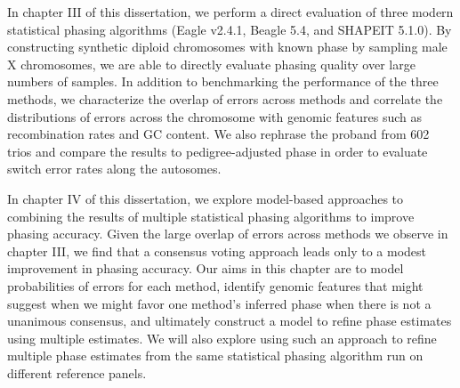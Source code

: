 In chapter III of this dissertation, we perform a direct evaluation of three modern statistical phasing algorithms (Eagle v2.4.1, Beagle 5.4, and SHAPEIT 5.1.0). By constructing synthetic diploid chromosomes with known phase by sampling male X chromosomes, we are able to directly evaluate phasing quality over large numbers of samples. In addition to benchmarking the performance of the three methods, we characterize the overlap of errors across methods and correlate the distributions of  errors across the chromosome with genomic features such as recombination rates and GC content. We also rephrase the proband from 602 trios and compare the results to pedigree-adjusted phase in order to evaluate switch error rates along the autosomes.

In chapter IV of this dissertation, we explore model-based approaches to combining the results of multiple statistical phasing algorithms to improve phasing accuracy. Given the large overlap of errors across methods we observe in chapter III, we find that a consensus voting approach leads only to a modest improvement in phasing accuracy. Our aims in this chapter are to model probabilities of errors for each method, identify genomic features that might suggest when we might favor one method’s inferred phase when there is not a unanimous consensus, and ultimately construct a model to refine phase estimates using multiple estimates. We will also explore using such an approach to refine multiple phase estimates from the same statistical phasing algorithm run on different reference panels.